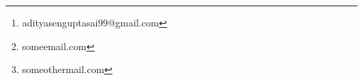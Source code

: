 \usepackage[left=2.50cm, right=2.50cm, top=2.00cm, bottom=2.00cm]{geometry}
\usepackage{authblk}

\renewcommand*{\Authsep}{, }
\renewcommand*{\Authand}{, }
\renewcommand*{\Authands}{, }
\renewcommand*{\Affilfont}{\normalsize}
\setlength{\affilsep}{2em}   %

\author[1]{Aditya Sengupta \thanks{adityasenguptasai99@gmail.com}}
\author[1*]{Bbbbb Bb \thanks{someemail.com}}
\author[2]{Ccccccc Ccc \thanks{someothermail.com}}

\usepackage{float}
	\let\origfigure\figure
	\let\endorigfigure\endfigure
	\renewenvironment{figure}[1][2] {
		\expandafter\origfigure\expandafter[H]		
	} {
		\endorigfigure
	}